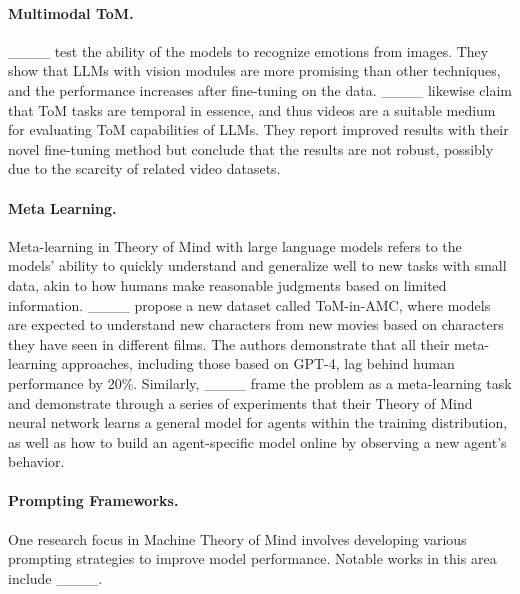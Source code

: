 \paragraph{Multimodal ToM.} ____ test the ability of the models to recognize emotions from images. They show that LLMs with vision modules are more promising than other techniques, and the performance increases after fine-tuning on the data. ____ likewise claim that ToM tasks are temporal in essence, and thus videos are a suitable medium for evaluating ToM capabilities of LLMs. They report improved results with their novel fine-tuning method but conclude that the results are not robust, possibly due to the scarcity of related video datasets.

\paragraph{Meta Learning.}
Meta-learning in Theory of Mind with large language models refers to the models' ability to quickly understand and generalize well to new tasks with small data, akin to how humans make reasonable judgments based on limited information. ____ propose a new dataset called ToM-in-AMC, where models are expected to understand new characters from new movies based on characters they have seen in different films. The authors demonstrate that all their meta-learning approaches, including those based on GPT-4, lag behind human performance by 20\%. Similarly, ____ frame the problem as a meta-learning task and demonstrate through a series of experiments that their Theory of Mind neural network learns a general model for agents within the training distribution, as well as how to build an agent-specific model online by observing a new agent’s behavior.

\paragraph{Prompting Frameworks.}
One research focus in Machine Theory of Mind involves developing various prompting strategies to improve model performance. Notable works in this area include ____.